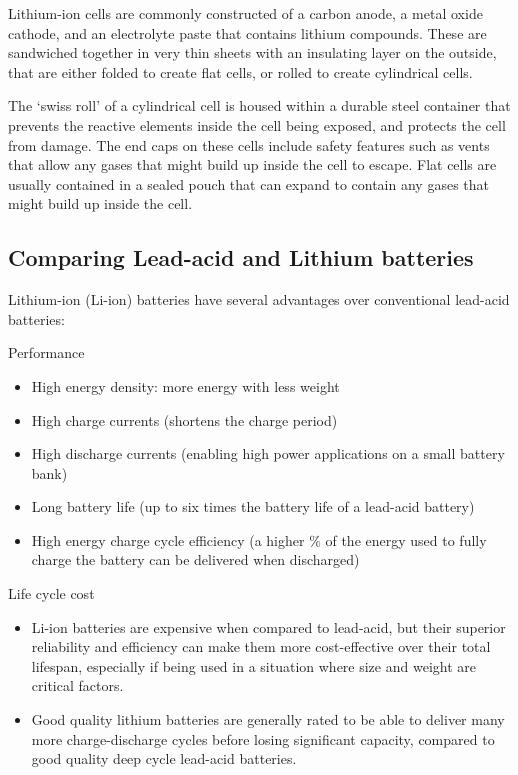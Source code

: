 \documentclass{article}
\theoremstyle{definition}
\theoremstyle{definition}
\theoremstyle{remark}
\begin{document}
  Lithium-ion cells are commonly constructed of a carbon anode, a metal oxide cathode, and an electrolyte paste that contains lithium compounds. These are sandwiched together in very thin sheets with an insulating layer on the outside, that are either folded to create flat cells, or rolled to create cylindrical cells.

  The ‘swiss roll’ of a cylindrical cell is housed within a durable steel container that prevents the reactive elements inside the cell being exposed, and protects the cell from damage. The end caps on these cells include safety features such as vents that allow any gases that might build up inside the cell to escape. Flat cells are usually contained in a sealed pouch that can expand to contain any gases that might build up inside the cell. 

  \subsection{Comparing Lead-acid and Lithium batteries} %
  \label{sub:comparing_lead_acid_and_lithium_batteries}

    Lithium-ion (Li-ion) batteries have several advantages over conventional lead-acid batteries:

    Performance

      \begin{itemize}
        \item High energy density: more energy with less weight
        \item High charge currents (shortens the charge period)
        \item High discharge currents (enabling high power applications on a small battery bank)
        \item Long battery life (up to six times the battery life of a lead-acid battery)
        \item High energy charge cycle efficiency (a higher \% of the energy used to fully charge the battery can be delivered when discharged)
      \end{itemize}

    Life cycle cost

      \begin{itemize}
        \item Li-ion batteries are expensive when compared to lead-acid, but their superior reliability and efficiency can make them more cost-effective over their total lifespan, especially if being used in a situation where size and weight are critical factors. 
        \item Good quality lithium batteries are generally rated to be able to deliver many more charge-discharge cycles before losing significant capacity, compared to good quality deep cycle lead-acid batteries.
      \end{itemize}
\end{document}
